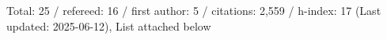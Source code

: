 Total: 25 / refereed: 16 / first author: 5 / citations: 2,559 / h-index: 17 (Last updated: 2025-06-12), List attached below